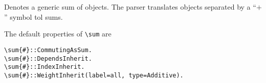 
Denotes a generic sum of objects. The parser translates objects
separated by a ``$+$'' symbol tol sums.

The default properties of \verb|\sum| are
\begin{verbatim}
\sum{#}::CommutingAsSum.
\sum{#}::DependsInherit.
\sum{#}::IndexInherit.
\sum{#}::WeightInherit(label=all, type=Additive).
\end{verbatim}
~


